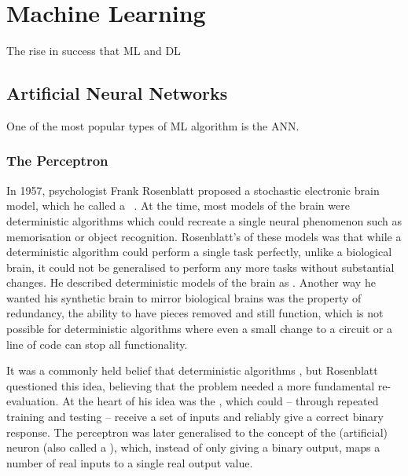 
\chapter{Machine Learning}

The rise in success that \ac{ML} and \ac{DL} 

\section{Artificial Neural Networks}

One of the most popular types of \ac{ML} algorithm is the \ac{ANN}.

\subsection{The Perceptron}

In 1957, psychologist Frank Rosenblatt proposed a stochastic electronic brain model, which he called a ~\autocite{rosenblatt1957}.
At the time, most models of the brain were deterministic algorithms which could recreate a single neural phenomenon such as memorisation or object recognition.
Rosenblatt's  of these models was that while a deterministic algorithm could perform a single task perfectly, unlike a biological brain, it could not be generalised to perform any more tasks without substantial changes.
He described deterministic models of the brain as .
Another way he wanted his synthetic brain to mirror biological brains was the property of redundancy, the ability to have pieces removed and still function, which is not possible for deterministic algorithms where even a small change to a circuit or a line of code can stop all functionality.

It was a commonly held belief that deterministic algorithms , but Rosenblatt questioned this idea, believing that the problem needed a more fundamental re-evaluation.
At the heart of his idea was the , which could -- through repeated training and testing -- receive a set of inputs and reliably give a correct binary response.
The perceptron was later generalised to the concept of the (artificial) neuron (also called a ), which, instead of only giving a binary output, maps a number of real inputs to a single real output value.

